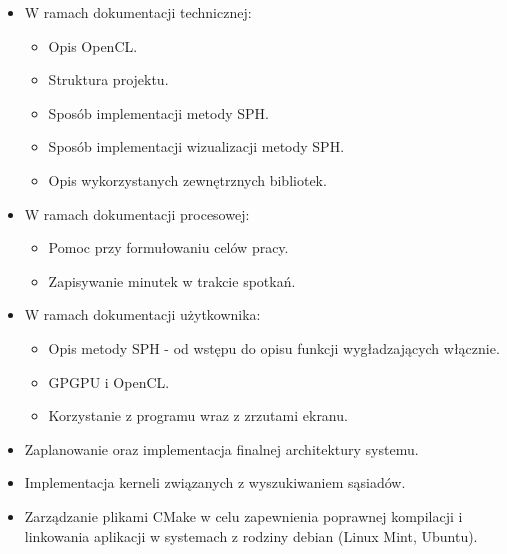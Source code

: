 \documentclass[polish, 12pt]{aghthesis}
\begin{document}
		\begin{itemize}
		
			\item W ramach dokumentacji technicznej:
			
				\begin{itemize}
				
					\item Opis OpenCL.
					\item Struktura projektu.
					\item Sposób implementacji metody SPH.
					\item Sposób implementacji wizualizacji metody SPH.
					\item Opis wykorzystanych zewnętrznych bibliotek.
				
				\end{itemize}
			
			\item W ramach dokumentacji procesowej:
			
				\begin{itemize}
				
					\item Pomoc przy formułowaniu celów pracy.
					\item Zapisywanie minutek w trakcie spotkań.
				
				\end{itemize}
			
			\item W ramach dokumentacji użytkownika:
			
				\begin{itemize}
				
					\item Opis metody SPH - od wstępu do opisu funkcji wygładzających włącznie.
					
					\item GPGPU i OpenCL.
					
					\item Korzystanie z programu wraz z zrzutami ekranu.
				
				\end{itemize}
			
			\item Zaplanowanie oraz implementacja finalnej architektury systemu.
			
			\item Implementacja kerneli związanych z wyszukiwaniem sąsiadów.
			
			\item Zarządzanie plikami CMake w celu zapewnienia poprawnej kompilacji i linkowania aplikacji w systemach z rodziny debian (Linux Mint, Ubuntu).
		
		\end{itemize}
		
\end{document}
